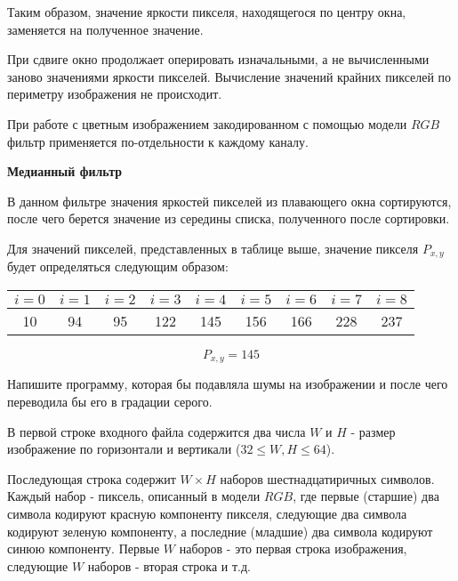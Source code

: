 Таким образом, значение яркости пикселя, находящегося по центру окна, заменяется на полученное значение.

При сдвиге окно продолжает оперировать изначальными, а не вычисленными заново значениями яркости пикселей. Вычисление значений крайних пикселей по периметру изображения не происходит.

При работе с цветным изображением закодированном с помощью модели $RGB$ фильтр применяется по-отдельности к каждому каналу.

\textbf{Медианный фильтр}

В данном фильтре значения яркостей пикселей из плавающего окна сортируются, после чего берется значение из середины списка, полученного после сортировки.

Для значений пикселей, представленных в таблице выше, значение пикселя $P_{x,y}$ будет определяться следующим образом:

\begin{table}[h!]
\centering
\begin{tabular}{ccccccccc}
\rowcolor[HTML]{EFEFEF} 
$i=0$                    & $i=1$                   & $i=2$                   & $i=3$                    & $i=4$                                            & $i=5$                    & $i=6$                    & $i=7$                    & $i=8$                    \\ \hline
\multicolumn{1}{|c|}{10} & \multicolumn{1}{c|}{94} & \multicolumn{1}{c|}{95} & \multicolumn{1}{c|}{122} & \multicolumn{1}{c|}{\cellcolor[HTML]{FFCE93}145} & \multicolumn{1}{c|}{156} & \multicolumn{1}{c|}{166} & \multicolumn{1}{c|}{228} & \multicolumn{1}{c|}{237} \\ \hline
\end{tabular}
\end{table}

$$P_{x,y} = 145$$

Напишите программу, которая бы подавляла шумы на изображении и после чего переводила бы его в градации серого.


В первой строке входного файла содержится два числа $W$ и $H$ - размер изображение по горизонтали и вертикали ($32 \le W, H \le 64$).

Последующая строка содержит $W \times H$ наборов шестнадцатиричных символов. Каждый набор - пиксель, описанный в модели $RGB$, где первые (старшие) два символа кодируют красную компоненту пикселя, следующие два символа кодируют зеленую компоненту, а последние (младшие) два символа кодируют синюю компоненту.
Первые $W$ наборов - это первая строка изображения, следующие $W$ наборов - вторая строка и т.д.

